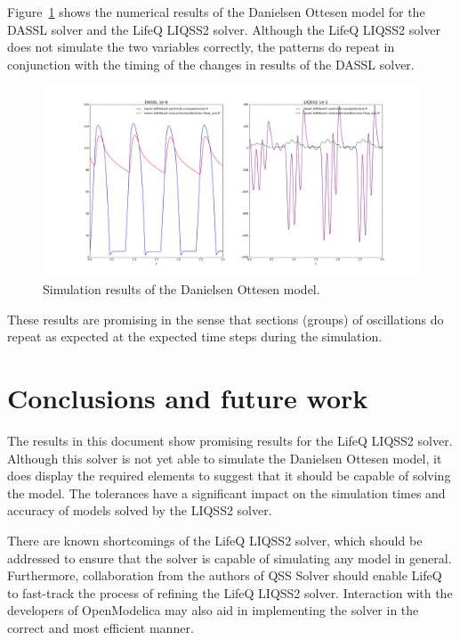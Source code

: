\documentclass[10pt]{article}
\begin{document}
Figure~\ref{Fig6} shows the numerical results of the Danielsen Ottesen model for the DASSL solver and the LifeQ LIQSS2 solver. Although the LifeQ LIQSS2 solver does not simulate the two variables correctly, the patterns do repeat in conjunction with the timing of the changes in results of the DASSL solver.

    \begin{figure}[htbp]\centering
   \includegraphics[scale=0.32, clip,trim={50mm 1mm 45mm 10mm}]{./Fig/Daniel.png}
\vspace{-0.8cm}
\caption{Simulation results of the Danielsen Ottesen model.}\label{Fig6}
\end{figure}

These results are promising in the sense that sections (groups) of oscillations do repeat as expected at the expected time steps during the simulation.

\newpage

\section{Conclusions and future work}

The results in this document show promising results for the LifeQ LIQSS2 solver. Although this solver is not yet able to simulate the Danielsen Ottesen model, it does display the required elements to suggest that it should be capable of solving the model. The tolerances have a significant impact on the simulation times and accuracy of models solved by the LIQSS2 solver.

There are known shortcomings of the LifeQ LIQSS2 solver, which should be addressed to ensure that the solver is capable of simulating any model in general. Furthermore, collaboration from the authors of QSS Solver should enable LifeQ to fast-track the process of refining the LifeQ LIQSS2 solver. Interaction with the developers of OpenModelica may also aid in implementing the solver in the correct and most efficient manner.
\end{document}
